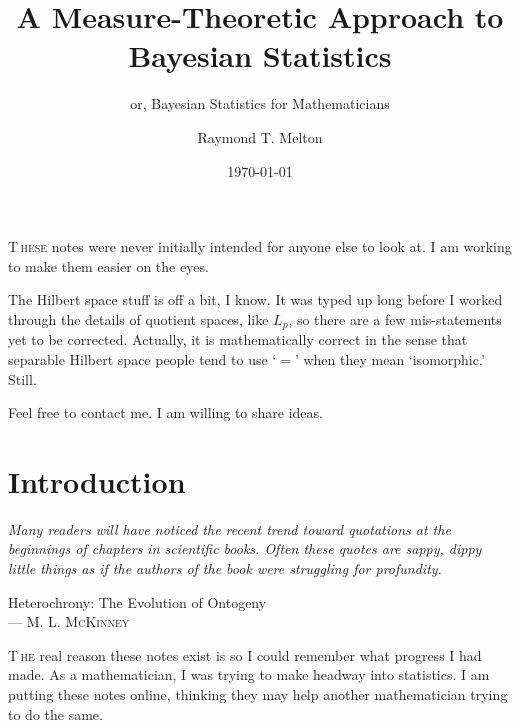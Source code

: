 \documentclass[
twoside=true,
paper=letter,
fontsize=11pt,
pagesize=auto,
leqno,
openany,
headsepline,
overfullrule,
]{scrbook}
\title{A Measure-Theoretic Approach to Bayesian Statistics}
\subtitle{or, Bayesian Statistics for Mathematicians}
\author{\textsf{Raymond T. Melton}}
\date{\textsf{\today}}
\theoremstyle{plain}
\theoremstyle{plain}
\theoremstyle{definition}
\theoremstyle{bfnoteitalic}
\theoremstyle{bfnoteroman}
\begin{document}
\frontmatter



\maketitle
{\renewcommand*\normalfont{}%
\normalfont%
\tableofcontents
}


\lettrine{T}{\,hese} notes were never initially intended for anyone else to look at.
I am working to make them easier on the eyes.

The Hilbert space stuff is off a bit, I know.
It was typed up long before I worked through the details of quotient spaces, like $L_p$, so there are a few mis-statements yet to be corrected. Actually, it is mathematically correct in the sense that separable Hilbert space people tend to use `$=$' when they mean `isomorphic.' Still.

Feel free to contact me. I am willing to share ideas.



\mainmatter
\chapter{Introduction}
\epigraph{\textit{Many readers will have noticed the recent trend toward quotations at the beginnings of chapters in scientific books.  Often these quotes are sappy, dippy little things as if the authors of the book were struggling for profundity.}}
{{Heterochrony: The Evolution of Ontogeny}\\ \textsc{--- M. L. McKinney}}

\lettrine{T}{\,he} real reason these notes exist is so I could remember what progress I had made. As a mathematician, I was trying to make headway into statistics.
I am putting these notes online, thinking  they may help another mathematician trying to do the same.
\end{document}
